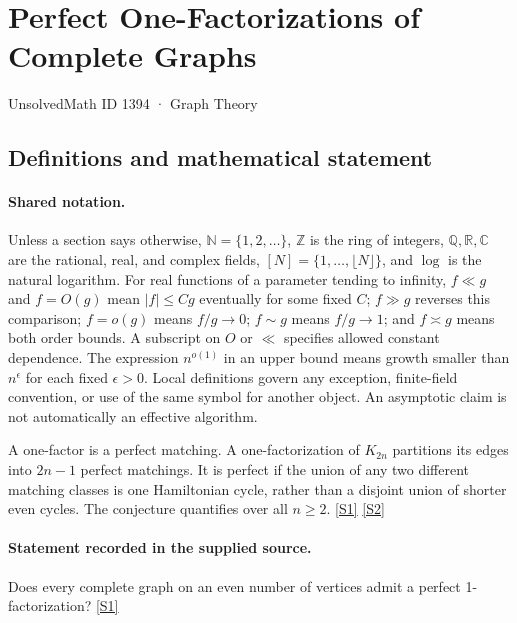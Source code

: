 \documentclass[11pt,a4paper]{article}
\newcommand{\N}{\mathbb{N}}
\newcommand{\Z}{\mathbb{Z}}
\newcommand{\Q}{\mathbb{Q}}
\newcommand{\R}{\mathbb{R}}
\newcommand{\C}{\mathbb{C}}
\newcommand{\sref}[2]{\hyperlink{source:#1:#2}{[S#2]}}
\begin{document}

\setcounter{section}{1393}

\section{Perfect One-Factorizations of Complete Graphs}\label{1394}

{\small\sffamily UnsolvedMath ID 1394 · Graph Theory}

\subsection{Definitions and mathematical statement}

\paragraph{Shared notation.}Unless a section says otherwise, $\N=\{1,2,\ldots\}$,
$\Z$ is the ring of integers, $\Q,\R,\C$ are the rational, real, and complex
fields, $[N]=\{1,\ldots,\lfloor N\rfloor\}$, and $\log$ is the natural
logarithm. For real functions of a parameter tending to infinity,
$f\ll g$ and $f=O(g)$ mean $|f|\leq Cg$ eventually for some fixed $C$;
$f\gg g$ reverses this comparison; $f=o(g)$ means $f/g\to0$;
$f\sim g$ means $f/g\to1$; and $f\asymp g$ means both order bounds.
A subscript on $O$ or $\ll$ specifies allowed constant dependence.
The expression $n^{o(1)}$ in an upper bound means growth smaller than
$n^\epsilon$ for each fixed $\epsilon>0$. Local definitions govern any
exception, finite-field convention, or use of the same symbol for another
object. An asymptotic claim is not automatically an effective algorithm.



A one-factor is a perfect matching. A one-factorization of $K_{2n}$ partitions its edges into $2n-1$ perfect matchings. It is perfect if the union of any two different matching classes is one Hamiltonian cycle, rather than a disjoint union of shorter even cycles. The conjecture quantifies over all $n\geq2$. \sref{1394}{1} \sref{1394}{2}

\paragraph{Statement recorded in the supplied source.}
Does every complete graph on an even number of vertices admit a perfect 1-factorization? \sref{1394}{1}
\end{document}

